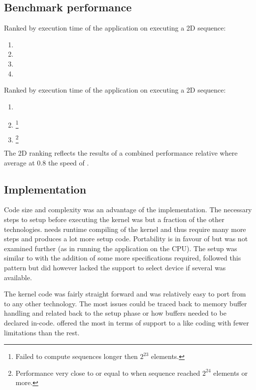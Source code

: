\subsection{Benchmark performance}

Ranked by execution time of the application on {\NVCARD} executing a \gls{2D} sequence:
\begin{enumerate}	
	\item {\CU}
	\item {\DX}
	\item {\GL}
	\item {\OCL}
\end{enumerate}

Ranked by execution time of the application on {\AMDCARD} executing a \gls{2D} sequence:
\begin{enumerate}	
	\item {\DX}
	\item {\GL}\footnote{Failed to compute sequences longer then $2^{23}$ elements.}
	\item {\OCL}\footnote{Performance very close to or equal to {\DX} when sequence reached $2^{24}$ elements or more.}
\end{enumerate}
The \gls{2D} ranking reflects the results of a combined performance relative {\OCL} where {\DX} average at $0.8$ the speed of {\OCL}.	

\subsection{Implementation}

Code size and complexity was an advantage of the {\CU} implementation. The necessary steps to setup before executing the kernel was but a fraction of the other technologies. {\OCL} needs runtime compiling of the kernel and thus require many more steps and produces a lot more setup code. Portability is in favour of {\OCL} but was not examined further (as in running the application on the \gls{CPU}). The {\DX} setup was similar to {\OCL} with the addition of some more specifications required, {\GL} followed this pattern but did however lacked the support to select device if several was available.

The kernel code was fairly straight forward and was relatively easy to port from {\CU} to any other technology. The most issues could be traced back to memory buffer handling and related back to the setup phase or how buffers needed to be declared in-code. {\CU} offered the most in terms of support to a {\CPP} like coding with fewer limitations than the rest.

